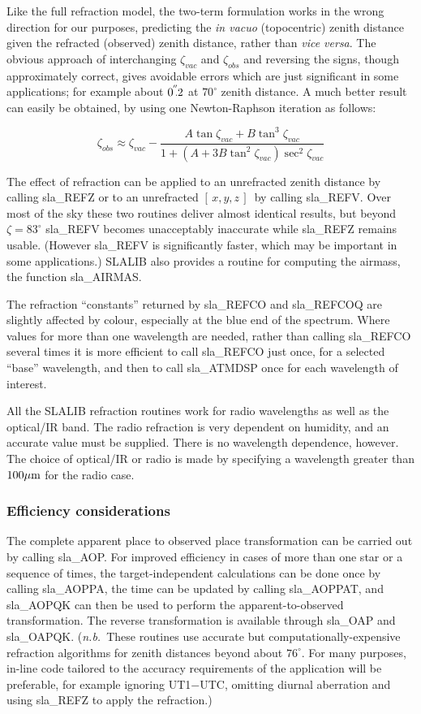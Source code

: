 \documentclass[11pt,twoside]{article}
\newcommand{\xyz}       {$[\,x,y,z\,]$}
\newcommand{\arcsec}[2] {\arcseci{#1}$\hspace{-0.4em}.#2$}
\newcommand{\arcsec}[2] {
      {$#1\hspace{-0.05em}^{'\hspace{-0.1em}'}\hspace{-0.4em}.#2$}
   }
\newcommand{\arcseci}[1] {$#1\hspace{-0.05em}$\raisebox{-0.5ex}
                         {$^{'\hspace{-0.1em}'}$}}
\renewcommand{\arcseci}[1] {$#1\hspace{-0.05em}^{'\hspace{-0.1em}'}$}
\begin{document}
Like the full refraction model, the two-term formulation works in the wrong
direction for our purposes, predicting
the {\it in vacuo}\/ (topocentric) zenith distance
given the refracted (observed) zenith distance,
rather than {\it vice versa}.  The obvious approach of
interchanging $\zeta _{vac}$ and $\zeta _{obs}$ and
reversing the signs, though approximately
correct, gives avoidable errors which are just significant in
some applications;  for
example about \arcsec{0}{2} at $70^\circ$ zenith distance.  A
much better result can easily be obtained, by using one Newton-Raphson
iteration as follows:

\[ \zeta _{obs} \approx \zeta _{vac}
    - \frac{A \tan \zeta _{vac} + B \tan ^{3}\zeta _{vac}}
    {1 + ( A + 3 B \tan ^{2}\zeta _{vac} ) \sec ^{2}\zeta _{vac}}\]

The effect of refraction can be applied to an unrefracted
zenith distance by calling
sla\_REFZ or to an unrefracted
\xyz\ by calling
sla\_REFV.
Over most of the sky these two routines deliver almost identical
results, but beyond $\zeta=83^\circ$
sla\_REFV
becomes unacceptably inaccurate while
sla\_REFZ
remains usable.  (However
sla\_REFV
is significantly faster, which may be important in some applications.)
SLALIB also provides a routine for computing the airmass, the function
sla\_AIRMAS.

The refraction ``constants'' returned by
sla\_REFCO and
sla\_REFCOQ
are slightly affected by colour, especially at the blue end
of the spectrum.  Where values for more than one
wavelength are needed, rather than calling
sla\_REFCO
several times it is more efficient to call
sla\_REFCO
just once, for a selected ``base'' wavelength, and then to call
sla\_ATMDSP
once for each wavelength of interest.

All the SLALIB refraction routines work for radio wavelengths as well
as the optical/IR band.  The radio refraction is very dependent on
humidity, and an accurate value must be supplied.  There is no
wavelength dependence, however.  The choice of optical/IR or
radio is made by specifying a wavelength greater than $100\mu {\rm m}$
for the radio case.

\subsubsection{Efficiency considerations}
The complete apparent place to observed place transformation
can be carried out by calling
sla\_AOP.
For improved efficiency
in cases of more than one star or a sequence of times, the
target-independent calculations can be done once by
calling
sla\_AOPPA,
the time can be updated by calling
sla\_AOPPAT,
and
sla\_AOPQK
can then be used to perform the
apparent-to-observed transformation.  The reverse transformation
is available through
sla\_OAP
and
sla\_OAPQK.
({\it n.b.}\ These routines use accurate but computationally-expensive
refraction algorithms for zenith distances beyond about $76^\circ$.
For many purposes, in-line code tailored to the accuracy requirements
of the application will be preferable, for example ignoring UT1$-$UTC,
omitting diurnal aberration and using
sla\_REFZ
to apply the refraction.)
\end{document}
